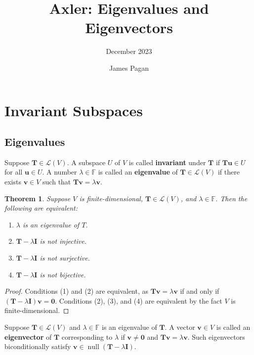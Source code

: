 \documentclass[11pt]{article}
\title{Axler: Eigenvalues and Eigenvectors}
\author{December 2023}
\date{James Pagan}
\renewcommand{\vec}[1]{\mathbf{#1}}
\newcommand{\mat}[1]{\mathbf{#1}}
\newcommand{\nll}{\operatorname{null}}
\newtheorem{theorem}{Theorem}
\begin{document}
\maketitle
\tableofcontents
\newpage


\section{Invariant Subspaces}


\subsection{Eigenvalues}

Suppose $\mat{T} \in \mathcal{L}(V)$. A subspace $U$ of $V$ is called \textbf{invariant} under $\mat{T}$ if $\mat{T} \vec{u} \in U$ for all $\vec{u} \in U$. A number $\lambda \in \mathbb{F}$ is called an \textbf{eigenvalue} of $\mat{T} \in \mathcal{L}(V)$ if there exists $\vec{v} \in V$ such that $\mat{T} \vec{v} = \lambda \vec{v}$.

\begin{theorem}
	Suppose $V$ is finite-dimensional, $\mat{T} \in \mathcal{L}(V)$, and $\lambda \in \mathbb{F}$. Then the following are equivalent:
	\begin{enumerate}
		\item $\lambda$ is an eigenvalue of $T$.
		\item $\mat{T} - \lambda \mat{I}$ is not injective.
		\item $\mat{T} - \lambda \mat{I}$ is not surjective.
		\item $\mat{T} - \lambda \mat{I}$ is not bijective.
	\end{enumerate}
\end{theorem}
\begin{adjustwidth}{1cm}{}
	\begin{proof}
		Conditions (1) and (2) are equivalent, as $\mat{T} \vec{v} = \lambda \vec{v}$ if and only if $(\mat{T} - \lambda \mat{I}) \vec{v} = \vec{0}$. Conditions (2), (3), and (4) are equivalent by the fact $V$ is finite-dimensional.
	\end{proof}
\end{adjustwidth}
 
Suppose $\mat{T} \in \mathcal{L}(V)$ and $\lambda \in \mathbb{F}$ is an eigenvalue of $\mat{T}$. A vector $\vec{v} \in V$ is called an \textbf{eigenvector} of $\mat{T}$ corresponding to $\lambda$ if $\vec{v} \ne \vec{0}$ and $\mat{T} \vec{v} = \lambda \vec{v}$. Such eigenvectors biconditionally satisfy $\vec{v} \in \nll (\mat{T} - \lambda \mat{I})$.
\end{document}
